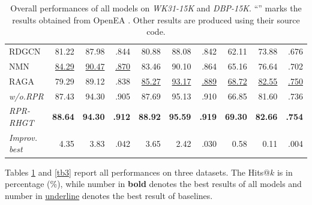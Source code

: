 \documentclass{article}
\begin{document}
\begin{table}[t]
{{\begin{tabular} {lrrrrrrrrr}
			\rowcolor{mygray}	
			RDGCN %
			&81.22	&87.98	&.844		&80.88	&88.08	&.842		&62.11	&73.88	&.676	\\
			
			NMN %
			&\underline{84.29}		&\underline{90.47}		&\underline{.870}	
			&83.46	&90.10	&.864	
			&65.16	&76.64	&.702	\\
			
			\rowcolor{mygray}	
			RAGA %
			&79.29	&89.12	&.838	
			&\underline{85.27}		&\underline{93.17}		&\underline{.889}	
			&\underline{68.72}		&\underline{82.55}		&\underline{.750}	\\
			
			
			\midrule
			\textit{w/o.RPR}	
			&87.43	&94.30	&.905		&87.69	&95.13	&.910		&66.85	&81.60	&.736	\\
			
			\rowcolor{mygray}	
			\textit{RPR-RHGT}	
			&\textbf{88.64}		&\textbf{94.30}		&\textbf{.912}	
			&\textbf{88.92}		&\textbf{95.59}		&\textbf{.919}	
			&\textbf{69.30}		&\textbf{82.66}		&\textbf{.754}	\\
			
			\midrule
			\textit{Improv. best}	
			&4.35	&3.83	&.042		&3.65	&2.42	&.030		&0.58	&0.11	&.004	\\
			\bottomrule
		\end{tabular}
}}

	\caption{	Overall performances of all models on \textit{WK31-15K} and \textit{DBP-15K}.
		“” marks the results obtained from OpenEA \protect \cite{sun_benchmarking_2020}.
		Other results are produced using their source code.	}
	\label{tb2}
\end{table}


Tables \ref{tb2} and \ref{tb3} report all performances on three datasets.
The Hits@$k$ is in percentage (\%), while number in \textbf{bold} denotes the best results of all models and number in \underline{underline} denotes the best result of baselines.
\end{document}
